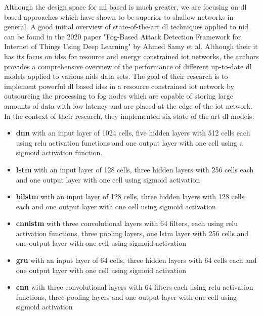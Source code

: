 Although the design space for \gls{ml} based is much greater, we are focusing on \gls{dl} based approaches which have shown to be superior to shallow networks in general. A good initial overview of state-of-the-art \gls{dl} techniques applied to \gls{nid} can be found in the 2020 paper "Fog-Based Attack Detection Framework for Internet of Things Using Deep Learning" \cite{fog_based_detection_survey_2020} by Ahmed Samy et al. Although their it has its focus on \glspl{ids} for resource and energy constrained \gls{iot} networks, the authors provides a comprehensive overview of the performance of different up-to-date \gls{dl} models applied to various \gls{nids} data sets. The goal of their research is to implement powerful \gls{dl} based \glspl{ids} in a resource constrained \gls{iot} network by outsourcing the processing to fog nodes which are capable of storing large amounts of data with low latency and are placed at the edge of the \gls{iot} network. In the context of their research, they implemented six state of the art \gls{dl} models:


\begin{itemize}
	\item \textbf{\gls{dnn}} with an input layer of 1024 cells, five hidden layers with 512 cells each using \gls{relu} activation functions and one output layer with one cell using a sigmoid activation function.
	\item \textbf{\gls{lstm}} with an input layer of 128 cells, three hidden layers with 256 cells each and one output layer with one cell using sigmoid activation 
	\item \textbf{\gls{bilstm}} with an input layer of 128 cells, three hidden layers with 128 cells each and one output layer with one cell using sigmoid activation
	\item \textbf{\gls{cnnlstm}} with three convolutional layers with 64 filters, each using \gls{relu} activation functions, three pooling layers, one \gls{lstm} layer with 256 cells and one output layer with one cell using sigmoid activation
	\item \textbf{\gls{gru}} with an input layer of 64 cells, three hidden layers with 64 cells each and one output layer with one cell using sigmoid activation
	\item \textbf{\gls{cnn}} with three convolutional layers with 64 filters each using \gls{relu} activation functions, three pooling layers and one output layer with one cell using sigmoid activation
\end{itemize}

